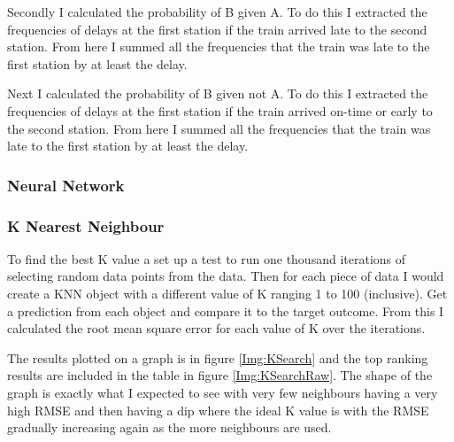 \documentclass[11pt]{article}
\begin{document}
	Secondly I calculated the probability of B given A. To do this I extracted the frequencies of delays at the first station if the train arrived late to the second station. From here I summed all the frequencies that the train was late to the first station by at least the delay.
	
	Next I calculated the probability of B given not A. To do this I extracted the frequencies of delays at the first station if the train arrived on-time or early to the second station. From here I summed all the frequencies that the train was late to the first station by at least the delay.	
	
	\subsubsection{Neural Network}
	
	
	\subsubsection{K Nearest Neighbour}
	To find the best K value a set up a test to run one thousand iterations of selecting random data points from the data. Then for each piece of data I would create a KNN object with a different value of K ranging 1 to 100 (inclusive). Get a prediction from each object and compare it to the target outcome. From this I calculated the root mean square error for each value of K over the iterations.
	
	The results plotted on a graph is in figure \ref{Img:KSearch} and the top ranking results are included in the table in figure \ref{Img:KSearchRaw}.	
	The shape of the graph is exactly what I expected to see with very few neighbours having a very high RMSE and then having a dip where the ideal K value is with the RMSE gradually increasing again as the more neighbours are used.
	
\end{document}
